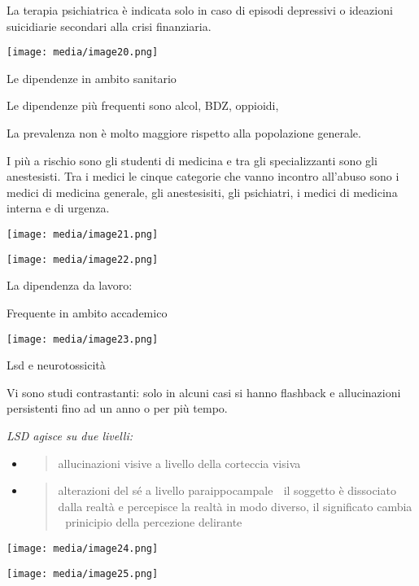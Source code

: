 \documentclass[]{article}
\begin{document}
La terapia psichiatrica è indicata solo in caso di episodi depressivi o
ideazioni suicidiarie secondari alla crisi finanziaria.

\texttt{[image: media/image20.png]}

Le dipendenze in ambito sanitario

Le dipendenze più frequenti sono alcol, BDZ, oppioidi,

La prevalenza non è molto maggiore rispetto alla popolazione generale.

I più a rischio sono gli studenti di medicina e tra gli specializzanti
sono gli anestesisti. Tra i medici le cinque categorie che vanno
incontro all'abuso sono i medici di medicina generale, gli anestesisiti,
gli psichiatri, i medici di medicina interna e di urgenza.

\texttt{[image: media/image21.png]}

\texttt{[image: media/image22.png]}

La dipendenza da lavoro:

Frequente in ambito accademico

\texttt{[image: media/image23.png]}

Lsd e neurotossicità

Vi sono studi contrastanti: solo in alcuni casi si hanno flashback e
allucinazioni persistenti fino ad un anno o per più tempo.

\emph{LSD agisce su due livelli:}

\begin{itemize}
\item
  \begin{quote}
  allucinazioni visive a livello della corteccia visiva
  \end{quote}
\item
  \begin{quote}
  alterazioni del sé a livello paraippocampale  il soggetto è
  dissociato dalla realtà e percepisce la realtà in modo diverso, il
  significato cambia  prinicipio della percezione delirante
  \end{quote}
\end{itemize}

\texttt{[image: media/image24.png]}

\texttt{[image: media/image25.png]}
\end{document}
